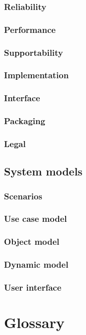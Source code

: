 \documentclass{article}
\begin{document}
		\subsubsection{Reliability}
		\subsubsection{Performance}
		\subsubsection{Supportability}
		\subsubsection{Implementation}
		\subsubsection{Interface}
		\subsubsection{Packaging}
		\subsubsection{Legal}
	\subsection{System models}
		\subsubsection{Scenarios}
		\subsubsection{Use case model}
		\subsubsection{Object model}
		\subsubsection{Dynamic model}
		\subsubsection{User interface}
\section{Glossary}
\end{document}
